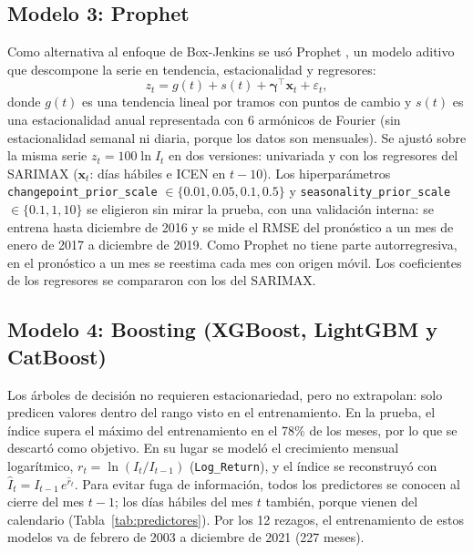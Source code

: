 \documentclass[conference]{IEEEtran}
\newcommand{\code}[1]{\texttt{#1}}
\begin{document}
\subsection{Modelo 3: Prophet}

Como alternativa al enfoque de Box-Jenkins se usó Prophet \cite{taylor2018}, un modelo aditivo que descompone la serie en tendencia, estacionalidad y regresores:
\begin{equation}
z_t = g(t) + s(t) + \boldsymbol{\gamma}^{\top}\mathbf{x}_t + \varepsilon_t,
\label{eq:prophet}
\end{equation}
donde $g(t)$ es una tendencia lineal por tramos con puntos de cambio y $s(t)$ es una estacionalidad anual representada con 6 armónicos de Fourier (sin estacionalidad semanal ni diaria, porque los datos son mensuales). Se ajustó sobre la misma serie $z_t = 100\ln I_t$ en dos versiones: univariada y con los regresores del SARIMAX ($\mathbf{x}_t$: días hábiles e ICEN en $t-10$). Los hiperparámetros \code{changepoint\_prior\_scale} $\in\{0.01, 0.05, 0.1, 0.5\}$ y \code{seasonality\_prior\_scale} $\in\{0.1, 1, 10\}$ se eligieron sin mirar la prueba, con una validación interna: se entrena hasta diciembre de 2016 y se mide el RMSE del pronóstico a un mes de enero de 2017 a diciembre de 2019. Como Prophet no tiene parte autorregresiva, en el pronóstico a un mes se reestima cada mes con origen móvil. Los coeficientes de los regresores se compararon con los del SARIMAX.

\subsection{Modelo 4: Boosting (XGBoost, LightGBM y CatBoost)}

Los árboles de decisión no requieren estacionariedad, pero no extrapolan: solo predicen valores dentro del rango visto en el entrenamiento. En la prueba, el índice supera el máximo del entrenamiento en el 78\% de los meses, por lo que se descartó como objetivo. En su lugar se modeló el crecimiento mensual logarítmico, $r_t = \ln(I_t/I_{t-1})$ (\code{Log\_Return}), y el índice se reconstruyó con $\hat{I}_t = I_{t-1}\,e^{\hat{r}_t}$. Para evitar fuga de información, todos los predictores se conocen al cierre del mes $t-1$; los días hábiles del mes $t$ también, porque vienen del calendario (Tabla~\ref{tab:predictores}). Por los 12 rezagos, el entrenamiento de estos modelos va de febrero de 2003 a diciembre de 2021 (227 meses).
\end{document}
